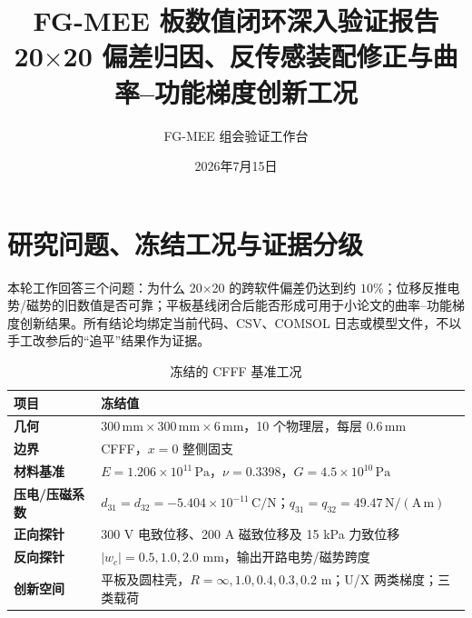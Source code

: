 \documentclass[UTF8,fontset=windows,11pt,a4paper]{ctexart}
\title{\textbf{FG-MEE 板数值闭环深入验证报告}\\[0.35em]
\large 20$\times$20 偏差归因、反传感装配修正与曲率--功能梯度创新工况}
\author{FG-MEE 组会验证工作台}
\date{2026年7月15日}
\begin{document}
\maketitle

\begin{center}
\end{center}

\newpage
\tableofcontents
\newpage

\section{研究问题、冻结工况与证据分级}

本轮工作回答三个问题：为什么 20$\times$20 的跨软件偏差仍达到约 $10\%$；位移反推电势/磁势的旧数值是否可靠；平板基线闭合后能否形成可用于小论文的曲率--功能梯度创新结果。所有结论均绑定当前代码、CSV、COMSOL 日志或模型文件，不以手工改参后的“追平”结果作为证据。

\begin{table}[H]
\centering
\caption{冻结的 CFFF 基准工况}
\begin{tabularx}{\textwidth}{>{\bfseries}lX}
\toprule
项目 & 冻结值 \\
\midrule
几何 & $300\,\mathrm{mm}\times300\,\mathrm{mm}\times6\,\mathrm{mm}$，10 个物理层，每层 $0.6\,\mathrm{mm}$ \\
边界 & CFFF，$x=0$ 整侧固支 \\
材料基准 & $E=1.206\times10^{11}\,\mathrm{Pa}$，$\nu=0.3398$，$G=4.5\times10^{10}\,\mathrm{Pa}$ \\
压电/压磁系数 & $d_{31}=d_{32}=-5.404\times10^{-11}\,\mathrm{C/N}$；$q_{31}=q_{32}=49.47\,\mathrm{N/(A\,m)}$ \\
正向探针 & 300 V 电致位移、200 A 磁致位移及 15 kPa 力致位移 \\
反向探针 & $|w_c|=0.5,1.0,2.0$ mm，输出开路电势/磁势跨度 \\
创新空间 & 平板及圆柱壳，$R=\infty,1.0,0.4,0.3,0.2$ m；U/X 两类梯度；三类载荷 \\
\bottomrule
\end{tabularx}
\end{table}
\end{document}
